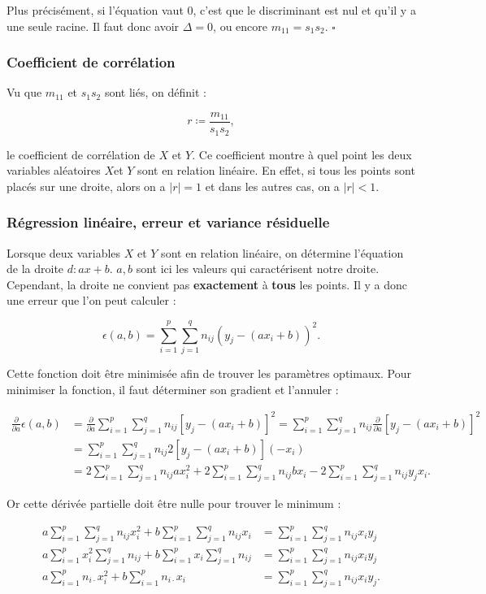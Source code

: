 \documentclass{article}
\renewcommand{\pd}[1]{\frac {\partial}{\partial #1}}
\begin{document}
			Plus précisément, si l'équation vaut 0, c'est que le discriminant est nul et qu'il y a une seule racine. Il faut donc avoir $\Delta = 0$, ou encore $m_{11} = s_1s_2$.
			$\square$

		\subsubsection{Coefficient de corrélation}
			Vu que $m_{11}$ et $s_1s_2$ sont liés, on définit :

			\[r \coloneqq \frac {m_{11}}{s_1s_2},\]

			le coefficient de corrélation de $X$ et $Y$. Ce coefficient montre à quel point les deux variables aléatoires $X$et $Y$ sont en relation linéaire.
			En effet, si tous les points sont placés sur une droite, alors on a $|r| = 1$ et dans les autres cas, on a $|r| < 1$.

		\subsubsection{Régression linéaire, erreur et variance résiduelle}
			Lorsque deux variables $X$ et $Y$ sont en relation linéaire, on détermine l'équation de la droite $d : ax + b$. $a, b$ sont ici les valeurs qui caractérisent
			notre droite. Cependant, la droite ne convient pas \textbf{exactement} à \textbf{tous} les points. Il y a donc une erreur que l'on peut calculer :

			\[\epsilon(a, b) = \sum_{i=1}^p\sum_{j=1}^qn_{ij}(y_j - (ax_i+b))^2.\]

			Cette fonction doit être minimisée afin de trouver les paramètres optimaux. Pour minimiser la fonction, il faut déterminer son gradient et l'annuler :

			\[\begin{aligned}
				\pd{a}\epsilon(a, b) &= \pd{a}\sum_{i=1}^p\sum_{j=1}^qn_{ij}\left[y_j - (ax_i + b)\right]^2 = \sum_{i=1}^p\sum_{j=1}^qn_{ij}\pd{a}[y_j-(ax_i+b)]^2 \\
									 &= \sum_{i=1}^p\sum_{j=1}^qn_{ij}2[y_j-(ax_i + b)](-x_i) \\
									 &= 2\sum_{i=1}^p\sum_{j=1}^qn_{ij}ax_i^2 + 2\sum_{i=1}^p\sum_{j=1}^qn_{ij}bx_i - 2\sum_{i=1}^p\sum_{j=1}^qn_{ij}y_jx_i.
			\end{aligned}\]

			Or cette dérivée partielle doit être nulle pour trouver le minimum :

			\[\begin{aligned}
				a\sum_{i=1}^p\sum_{j=1}^qn_{ij}x_i^2 + b\sum_{i=1}^p\sum_{j=1}^qn_{ij}x_i &= \sum_{i=1}^p\sum_{j=1}^qn_{ij}x_iy_j \\
				a\sum_{i=1}^px_i^2\sum_{j=1}^qn_{ij} + b\sum_{i=1}^px_i\sum_{j=1}^qn_{ij} &= \sum_{i=1}^p\sum_{j=1}^qn_{ij}x_iy_j \\
				a\sum_{i=1}^pn_{i\cdot}x_i^2 + b\sum_{i=1}^pn_{i\cdot}x_i &= \sum_{i=1}^p\sum_{j=1}^qn_{ij}x_iy_j.
			\end{aligned}\]
\end{document}
